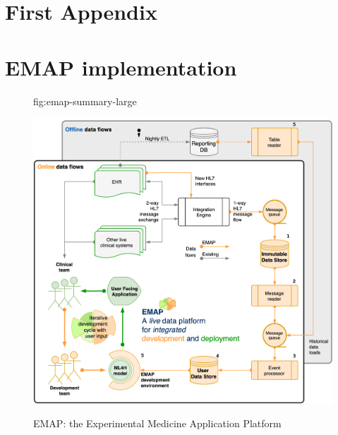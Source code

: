 \documentclass[pmlr,twocolumn,10pt]{jmlr} %
\begin{document}



\appendix

\section{First Appendix}\label{apd:first}


\section{EMAP implementation}\label{apd:second}

\begin{figure}[htbp]
\floatconts
  {fig:emap-summary-large}
  {\caption{EMAP: the Experimental Medicine Application Platform}}
 {\includegraphics[width=1.0\textwidth]{images/emap-summary-emap-summary.png}}

\end{figure}
\end{document}
